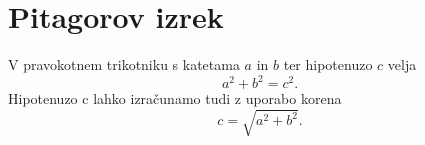 \documentclass{article}
\begin{document}
\section*{Pitagorov izrek}
V pravokotnem trikotniku s katetama \(a\) in \(b\) ter hipotenuzo \(c\) velja
\[ a^2 + b^2 = c^2. \]
Hipotenuzo c lahko izračunamo tudi z uporabo korena
\[c = \sqrt{a^2 + b^2}.\]
\end{document}
